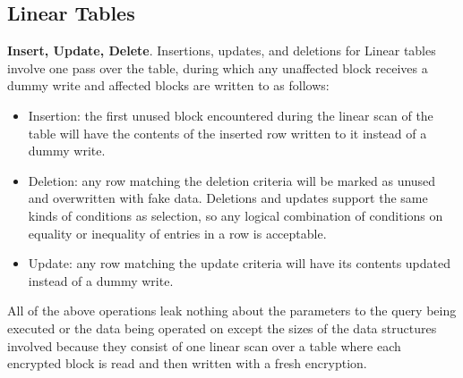\documentclass[letterpaper,twocolumn,10pt]{article}
\begin{document}
\subsection{Linear Tables}
  \noindent \textbf{Insert, Update, Delete}. 
Insertions, updates, and deletions for Linear tables involve one pass over the table, during which any unaffected block receives a dummy write and affected blocks are written to as follows:
\begin{itemize}[itemsep=0pt,parsep=0pt]
\item Insertion: the first unused block encountered during the linear scan of the table will have the contents of the inserted row written to it instead of a dummy write.
\item Deletion: any row matching the deletion criteria will be marked as unused and overwritten with fake data. Deletions and updates support the same kinds of conditions as selection, so any logical combination of conditions on equality or inequality of entries in a row is acceptable. 
\item Update: any row matching the update criteria will have its contents updated instead of a dummy write. 
\end{itemize}

All of the above operations leak nothing about the parameters to the query being executed or the data being operated on except the sizes of the data structures involved because they consist of one linear scan over a table where each encrypted block is read and then written with a fresh encryption. 
\end{document}
